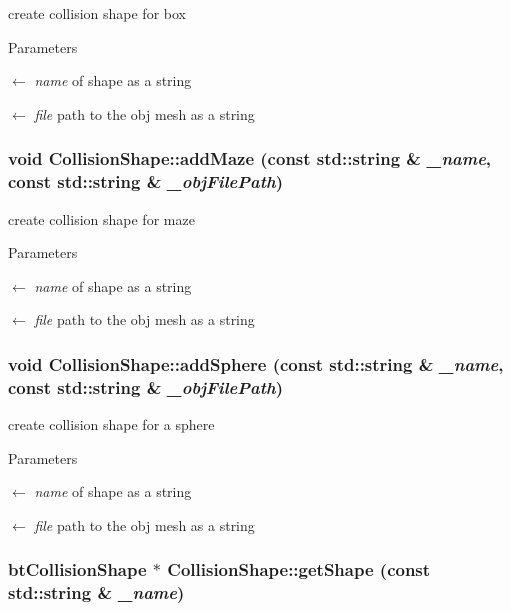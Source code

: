 create collision shape for box 
\begin{DoxyParams}{Parameters}
\item[\mbox{$\leftarrow$} {\em name}]of shape as a string \item[\mbox{$\leftarrow$} {\em file}]path to the obj mesh as a string \end{DoxyParams}
\hypertarget{classCollisionShape_a61c367ab49609cb28636080853dd0a2c}{
\subsubsection[{addMaze}]{\setlength{\rightskip}{0pt plus 5cm}void CollisionShape::addMaze (const std::string \& {\em \_\-name}, \/  const std::string \& {\em \_\-objFilePath})}}
\label{classCollisionShape_a61c367ab49609cb28636080853dd0a2c}


create collision shape for maze 
\begin{DoxyParams}{Parameters}
\item[\mbox{$\leftarrow$} {\em name}]of shape as a string \item[\mbox{$\leftarrow$} {\em file}]path to the obj mesh as a string \end{DoxyParams}
\hypertarget{classCollisionShape_aae7739c3bf1be44f3f8722cfe76bc8cc}{
\subsubsection[{addSphere}]{\setlength{\rightskip}{0pt plus 5cm}void CollisionShape::addSphere (const std::string \& {\em \_\-name}, \/  const std::string \& {\em \_\-objFilePath})}}
\label{classCollisionShape_aae7739c3bf1be44f3f8722cfe76bc8cc}


create collision shape for a sphere 
\begin{DoxyParams}{Parameters}
\item[\mbox{$\leftarrow$} {\em name}]of shape as a string \item[\mbox{$\leftarrow$} {\em file}]path to the obj mesh as a string \end{DoxyParams}
\hypertarget{classCollisionShape_ac2fc5b4b07d9b6f6551d1e021e65626e}{
\subsubsection[{getShape}]{\setlength{\rightskip}{0pt plus 5cm}btCollisionShape $\ast$ CollisionShape::getShape (const std::string \& {\em \_\-name})}}
\label{classCollisionShape_ac2fc5b4b07d9b6f6551d1e021e65626e}


